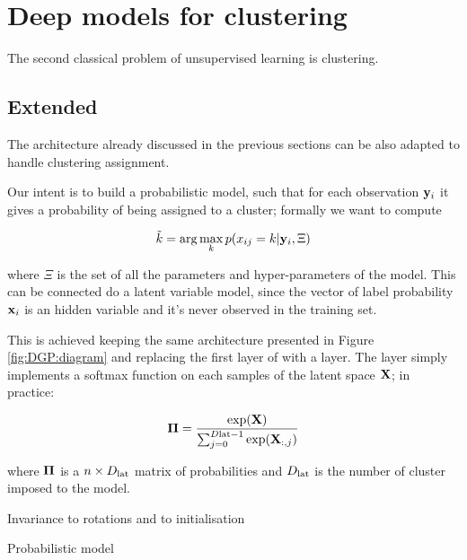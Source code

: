 
\section{Deep models for clustering}

The second classical problem of unsupervised learning is clustering. 

\subsection{Extended \dgplvm}

The architecture already discussed in the previous sections can be also adapted to handle clustering assignment.

Our intent is to build a probabilistic model, such that for each observation $\mathbf{y}_i$ it gives a probability of being assigned to a cluster; formally we want to compute

\begin{equation}
    \tilde k = \arg\max_{k}p(x_{ij}=k\vert\mathbf{y}_i, \Xi)
\end{equation}

where $\Xi$ is the set of all the parameters and hyper-parameters of the model. This can be connected do a latent variable model, since the vector of label probability $\mathbf{x}_i$ is an hidden variable and it's never observed in the training set.

This is achieved keeping the same architecture presented in Figure \ref{fig:DGP:diagram} and replacing the first layer of  with a \softmax layer. The \softmax layer simply implements a softmax function on each samples of the latent space $\mathbf{X}$; in practice:

\begin{equation}
    \boldsymbol{\Pi} = \dfrac{\exp(\mathbf{X})} {\sum_{j=0}^{D\mathrm{lat} - 1} \exp(\mathbf{X}_{:,j})}
\end{equation}

where $\boldsymbol{\Pi}$ is a $n\times D_\mathrm{lat}$ matrix of probabilities and $D_\mathrm{lat}$ is the number of cluster imposed to the model.


Invariance to rotations and to initialisation

Probabilistic model
